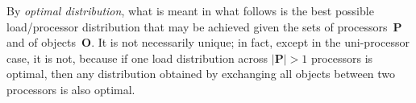 By \emph{optimal distribution}, what is meant in what follows is
the best possible load/processor distribution that may be achieved given
the sets of processors~$\mathbf{P}$ and of objects~$\mathbf{O}$.
It is not necessarily unique; in fact, except in the uni-processor
case, it is not, because if one load distribution across
$\vert{\mathbf{P}}\vert>1$ processors is optimal, then any
distribution obtained by exchanging all objects between two processors
is also optimal.
